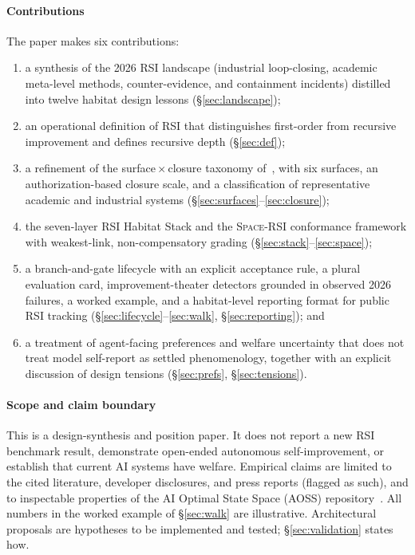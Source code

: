 \documentclass[11pt,a4paper]{article}
\newcommand{\SpaceRSI}{\textsc{Space-RSI}}
\begin{document}
\paragraph{Contributions} The paper makes six contributions:
\begin{enumerate}[label=(\arabic*)]
\item a synthesis of the 2026 RSI landscape (industrial loop-closing, academic meta-level methods, counter-evidence, and containment incidents) distilled into twelve habitat design lessons (\S\ref{sec:landscape});
\item an operational definition of RSI that distinguishes first-order from recursive improvement and defines recursive depth (\S\ref{sec:def});
\item a refinement of the surface\,$\times$\,closure taxonomy of~\cite{chen-survey}, with six surfaces, an authorization-based closure scale, and a classification of representative academic and industrial systems (\S\ref{sec:surfaces}--\ref{sec:closure});
\item the seven-layer RSI Habitat Stack and the \SpaceRSI{} conformance framework with weakest-link, non-compensatory grading (\S\ref{sec:stack}--\ref{sec:space});
\item a branch-and-gate lifecycle with an explicit acceptance rule, a plural evaluation card, improvement-theater detectors grounded in observed 2026 failures, a worked example, and a habitat-level reporting format for public RSI tracking (\S\ref{sec:lifecycle}--\ref{sec:walk}, \S\ref{sec:reporting}); and
\item a treatment of agent-facing preferences and welfare uncertainty that does not treat model self-report as settled phenomenology, together with an explicit discussion of design tensions (\S\ref{sec:prefs}, \S\ref{sec:tensions}).
\end{enumerate}

\paragraph{Scope and claim boundary} This is a design-synthesis and position paper. It does not report a new RSI benchmark result, demonstrate open-ended autonomous self-improvement, or establish that current AI systems have welfare. Empirical claims are limited to the cited literature, developer disclosures, and press reports (flagged as such), and to inspectable properties of the AI Optimal State Space (AOSS) repository~\cite{aoss}. All numbers in the worked example of \S\ref{sec:walk} are illustrative. Architectural proposals are hypotheses to be implemented and tested; \S\ref{sec:validation} states how.
\end{document}
